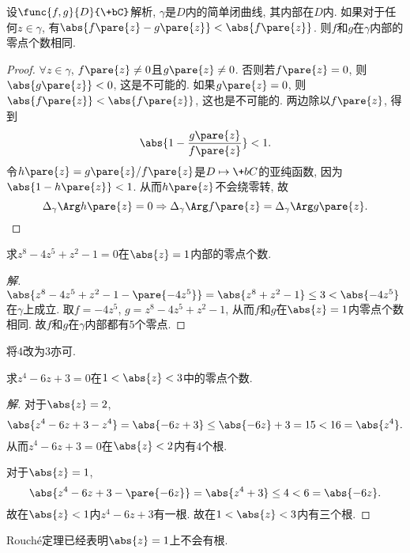 \documentclass{ctexart}
\begin{document}
\begin{theorem}
    设$\func{f,g}{D}{\+bC}$解析, $\gamma$是$D$内的简单闭曲线, 其内部在$D$内. 如果对于任何$z\in\gamma$, 有$\abs{f\pare{z} - g\pare{z}} < \abs{f\pare{z}}$. 则$f$和$g$在$\gamma$内部的零点个数相同.
\end{theorem}
\begin{proof}
    $\forall z\in\gamma$, $f\pare{z} \neq 0$且$g\pare{z} \neq 0$. 否则若$f\pare{z} = 0$, 则$\abs{g\pare{z}}<0$, 这是不可能的. 如果$g\pare{z} = 0$, 则$\abs{f\pare{z}} < \abs{f\pare{z}}$, 这也是不可能的. 两边除以$f\pare{z}$, 得到
    \[ \abs{1 - \frac{g\pare{z}}{f\pare{z}}} < 1. \]
    令$h\pare{z} = g\pare{z}/f\pare{z}$是$D\mapsto \+bC$的亚纯函数, 因为$\abs{1-h\pare{z}} < 1$. 从而$h\pare{z}$不会绕零转, 故
    \[ \Delta_\gamma \Arg h\pare{z} = 0 \Rightarrow \Delta_\gamma \Arg f\pare{z} = \Delta_\gamma \Arg g\pare{z}. \qedhere \]
\end{proof}
\begin{sample}
    \begin{ex}
        求$z^8 - 4z^5 + z^2 - 1 = 0$在$\abs{z} = 1$内部的零点个数.
    \end{ex}
    \begin{proof}[解]
        $\abs{z^8 - 4z^5 + z^2 - 1 - \pare{-4z^5}} = \abs{z^8 + z^2 - 1} \le 3 < \abs{-4z^5}$在$\gamma$上成立. 取$f = -4z^5$, $g = z^8 - 4z^5 + z^2 - 1$, 从而$f$和$g$在$\abs{z} = 1$内零点个数相同. 故$f$和$g$在$\gamma$内部都有$5$个零点.
    \end{proof}
    \begin{remark}
        将$4$改为$3$亦可.
    \end{remark}
\end{sample}
\begin{sample}
    \begin{ex}
        求$z^4 - 6z + 3 = 0$在$1<\abs{z}<3$中的零点个数. 
    \end{ex}
    \begin{proof}[解]
        对于$\abs{z} = 2$,
        \[ \abs{z^4 - 6z + 3 - z^4} = \abs{-6z + 3} \le \abs{-6z} + 3 = 15 < 16 = \abs{z^4}. \]
        从而$z^4 - 6z + 3 = 0$在$\abs{z} < 2$内有$4$个根.
        \par
        对于$\abs{z} = 1$,
        \[ \abs{z^4 - 6z + 3 - \pare{-6z}} = \abs{z^4 + 3} \le 4 < 6 = \abs{-6z}. \]
        故在$\abs{z}<1$内$z^4 - 6z + 3$有一根. 故在$1 < \abs{z} < 3$内有三个根.
    \end{proof}
    \begin{remark}
        Rouch\'e定理已经表明$\abs{z}=1$上不会有根.
    \end{remark}
\end{sample}
\end{document}
